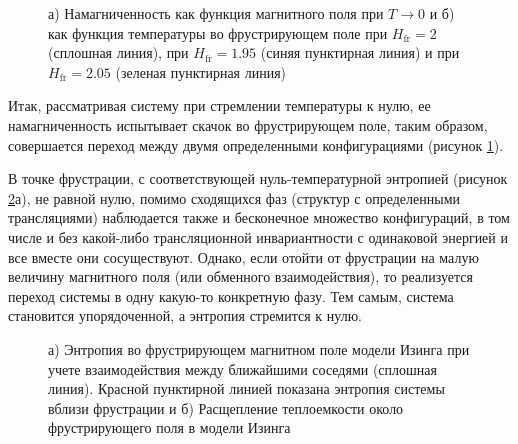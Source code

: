  \begin{figure}[h]
 	\begin{minipage}[h]{0.49\linewidth}
 	\end{minipage}
 	\hfill
 	\begin{minipage}[h]{0.49\linewidth}
 	\end{minipage}
 	\caption{а) Намагниченность как функция магнитного поля при $T\rightarrow 0$ и б) как функция температуры во фрустрирующем поле при $H_{\text{fr}}=2$ (сплошная линия), при $H_{\text{fr}}=1.95$ (синяя пунктирная линия) и при $H_{\text{fr}}=2.05$ (зеленая пунктирная линия)}
 	\label{magFrust}
 \end{figure}

Итак, рассматривая систему при стремлении температуры к нулю, ее намагниченность испытывает скачок во фрустрирующем поле, таким образом, совершается переход между двумя определенными конфигурациями (рисунок \ref{magFrust}).

В точке фрустрации, с соответствующей нуль-температурной энтропией (рисунок \ref{EntHeatFrust}а), не равной нулю, помимо сходящихся фаз (структур с определенными трансляциями) наблюдается также и бесконечное множество конфигураций, в том числе и без какой-либо трансляционной инвариантности с одинаковой энергией и все вместе они сосуществуют. Однако, если отойти от фрустрации на малую величину магнитного поля (или обменного взаимодействия), то реализуется переход системы в одну какую-то конкретную фазу. Тем самым, система становится упорядоченной, а энтропия стремится к нулю.

 \begin{figure}[h]
 	\begin{minipage}[h]{0.49\linewidth}
 	\end{minipage}
 	\hfill
 	\begin{minipage}[h]{0.49\linewidth}
 	\end{minipage}
 	\caption{а) Энтропия во фрустрирующем магнитном поле модели Изинга при учете взаимодействия между ближайшими соседями (сплошная линия). Красной пунктирной линией показана энтропия системы вблизи фрустрации и б) Расщепление теплоемкости около фрустрирующего поля в модели Изинга}
 	\label{EntHeatFrust}
 \end{figure}

